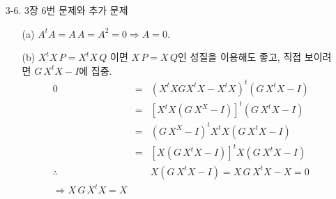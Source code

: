 \documentclass[fleqn, a4paper]{article}\usepackage[]{graphicx}\usepackage[]{color}
\begin{document}
\newcommand{\bm}[1]{\mbox{\boldmath{$#1$}}}
\begin{enumerate}
\item[3-6.] 3장 6번 문제와 추가 문제 
\begin{enumerate}
\item[(a)] $A^tA = A\,A = A^2 = 0\Rightarrow A = 0$.
\item[(b)] $X^tX\,P = X^tX\,Q$ 이면 $X\,P = X\,Q$인 성질을 이용해도 좋고, 직접 보이려면 $G\,X^tX - I$에 집중.
\begin{eqnarray*}
0&=&(X^tXGX^tX-X^tX)^t(G\,X^tX-I)\\
&=&[X^tX(G\,X^X-I)]^t(G\,X^tX-I)\\
&=&(G\,X^X-I)^tX^tX(G\,X^tX-I)\\
&=&[X(G\,X^tX-I)]^tX(G\,X^tX-I)\\
\therefore &&X(G\,X^tX-I)=X\,G\,X^tX-X=0\\
\Rightarrow X\,G\,X^tX = X
\end{eqnarray*}
\end{enumerate}
\end{enumerate}
\end{document}
